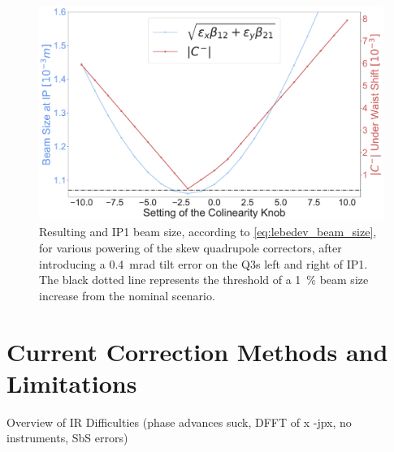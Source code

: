 \begin{figure}[!htb]
    \centering
    \includegraphics*[width=0.99\columnwidth]{Figures/Chapter4/colin_correct_dqmin_lebedev_tilt4e-4.pdf}
    \caption{Resulting \AbsCminus and IP1 beam size, according to \cref{eq:lebedev_beam_size}, for various powering of the skew quadrupole correctors, after introducing a \qty{0.4}{\milli\radian} tilt error on the Q3s left and right of IP1. The black dotted line represents the threshold of a \qty{1}{\percent} beam size increase from the nominal scenario.}
    \label{fig:colin_correction_dqmin_lebedev}
\end{figure}

\section{Current Correction Methods and Limitations}

Overview of IR Difficulties (phase advances suck, DFFT of x -jpx, no instruments, SbS errors)





